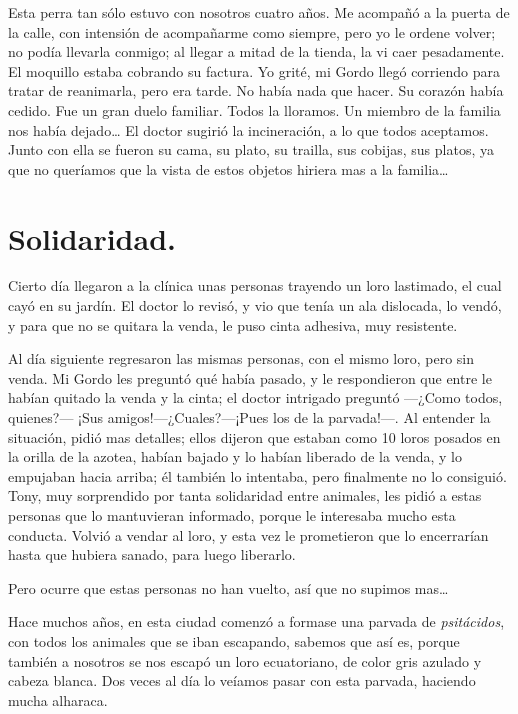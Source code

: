 \documentclass[letterpaper, 12pt]{book}
\begin{document}
Esta perra tan sólo estuvo con nosotros cuatro años. Me acompañó a la puerta de la calle, con intensión de acompañarme como siempre, pero yo le ordene volver; no podía llevarla conmigo; al llegar a mitad de la tienda, la vi caer pesadamente. El moquillo estaba cobrando su factura. Yo grité, mi Gordo llegó corriendo para tratar de reanimarla, pero era tarde. No había nada que hacer. Su corazón había cedido. Fue un gran duelo familiar. Todos la lloramos. Un miembro de la familia nos había dejado\ldots
El doctor sugirió la incineración, a lo que todos aceptamos. Junto con ella se fueron su cama, su plato, su trailla, sus cobijas, sus platos, ya que no queríamos que la vista de estos objetos hiriera mas a la familia\ldots


\chapter{Solidaridad.}

Cierto día llegaron a la clínica unas personas trayendo un loro lastimado, el cual cayó en su jardín. El doctor lo revisó, y vio que tenía un ala dislocada, lo vendó, y para que no se quitara la venda, le puso cinta adhesiva, muy resistente. 

Al día siguiente regresaron las mismas personas, con el mismo loro, pero sin venda. Mi Gordo les preguntó qué había pasado, y le respondieron que entre le habían quitado la venda y la cinta; el doctor intrigado preguntó ---¿Como todos, quienes?---
¡Sus amigos!---¿Cuales?---¡Pues los de la parvada!---. Al entender la situación, pidió mas detalles; ellos dijeron que estaban como 10 loros posados en la orilla de la azotea, habían bajado y lo habían liberado de la venda, y lo empujaban hacia arriba; él también lo intentaba, pero finalmente no lo consiguió. Tony, muy sorprendido por tanta solidaridad entre animales, les pidió a estas personas que lo mantuvieran informado, porque le interesaba mucho esta conducta. Volvió a vendar al loro, y esta vez le prometieron que lo encerrarían hasta que hubiera sanado, para luego liberarlo.

Pero ocurre que estas personas no han vuelto, así que no supimos mas\ldots

Hace muchos años, en esta ciudad comenzó a formase una parvada de \textit{psitácidos}, con todos los animales que se iban escapando, sabemos que así es, porque también a nosotros se nos escapó un loro ecuatoriano, de color gris azulado y cabeza blanca. Dos veces al día lo veíamos pasar con esta parvada, haciendo mucha alharaca. 
\end{document}
